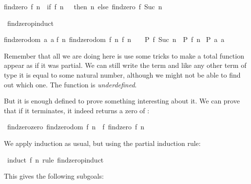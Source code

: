 \begin{isabellebody}
\begin{isamarkuptext}
\begin{isabelle}
findzero\ {\isacharquery}f\ {\isacharquery}n\ {\isacharequal}\ {\isacharparenleft}if\ {\isacharquery}f\ {\isacharquery}n\ {\isacharequal}\ {}\ then\ {\isacharquery}n\ else\ findzero\ {\isacharquery}f\ {\isacharparenleft}Suc\ {\isacharquery}n{\isacharparenright}{\isacharparenright}%
\end{isabelle}%
\end{isamarkuptext}%
\isamarkuptrue%
\isamarkupfalse%
\ findzero{\isachardot}pinduct%
\begin{isamarkuptext}%
\begin{isabelle}%
{\isasymlbrakk}findzero{\isacharunderscore}dom\ {\isacharparenleft}{\isacharquery}a{}{\isachardot}{}{\isacharcomma}\ {\isacharquery}a{}{\isachardot}{}{\isacharparenright}{\isacharsemicolon}\isanewline
\isaindent{\ }{\isasymAnd}f\ n{\isachardot}\ {\isasymlbrakk}findzero{\isacharunderscore}dom\ {\isacharparenleft}f{\isacharcomma}\ n{\isacharparenright}{\isacharsemicolon}\ f\ n\ {\isasymnoteq}\ {}\ {\isasymLongrightarrow}\ {\isacharquery}P\ f\ {\isacharparenleft}Suc\ n{\isacharparenright}{\isasymrbrakk}\ {\isasymLongrightarrow}\ {\isacharquery}P\ f\ n{\isasymrbrakk}\isanewline
{\isasymLongrightarrow}\ {\isacharquery}P\ {\isacharquery}a{}{\isachardot}{}\ {\isacharquery}a{}{\isachardot}{}%
\end{isabelle}%
\end{isamarkuptext}%
\isamarkuptrue%
%
\begin{isamarkuptext}%
Remember that all we
  are doing here is use some tricks to make a total function appear
  as if it was partial. We can still write the term  and like any other term of type  it is equal
  to some natural number, although we might not be able to find out
  which one. The function is \emph{underdefined}.

  But it is enough defined to prove something interesting about it. We
  can prove that if 
  it terminates, it indeed returns a zero of :%
\end{isamarkuptext}%
\isamarkuptrue%
\isamarkupfalse%
\ findzero{\isacharunderscore}zero{\isacharcolon}\ {\isachardoublequoteopen}findzero{\isacharunderscore}dom\ {\isacharparenleft}f{\isacharcomma}\ n{\isacharparenright}\ {\isasymLongrightarrow}\ f\ {\isacharparenleft}findzero\ f\ n{\isacharparenright}\ {\isacharequal}\ {}{\isachardoublequoteclose}%
\isadelimproof
%
\endisadelimproof
%
\isatagproof
%
\begin{isamarkuptxt}%
We apply induction as usual, but using the partial induction
  rule:%
\end{isamarkuptxt}%
\isamarkuptrue%
\isamarkupfalse%
\ {\isacharparenleft}induct\ f\ n\ rule{\isacharcolon}\ findzero{\isachardot}pinduct{\isacharparenright}%
\begin{isamarkuptxt}%
This gives the following subgoals:


\end{isamarkuptxt}
\end{isabellebody}
